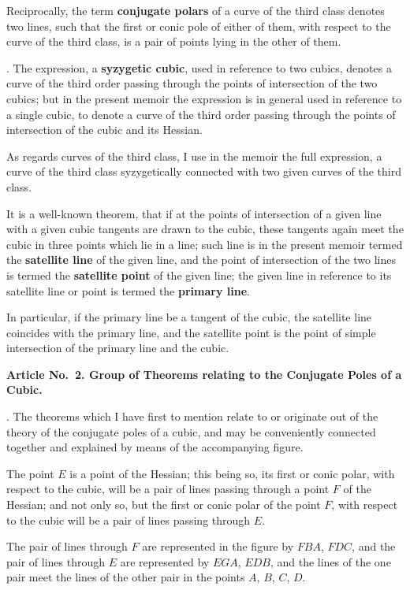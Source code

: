 \documentclass[11pt,a4paper]{book}
\begin{document}
\begin{center}
Reciprocally, the term \textbf{conjugate polars} of a curve of the
third class denotes two lines, such that the first or conic pole
of either of them, with respect to the curve of the third class,
is a pair of points lying in the other of them.

. The expression, a \textbf{syzygetic cubic}, used in reference to
two cubics, denotes a curve of the third order passing through
the points of intersection of the two cubics; but in the present
memoir the expression is in general used in reference to a single
cubic, to denote a curve of the third order passing through the
points of intersection of the cubic and its Hessian.

As regards curves of the third class, I use in the memoir
the full expression, a curve of the third class syzygetically
connected with two given curves of the third class.

It is a well-known theorem, that if at the points of intersection
of a given line with a given cubic tangents are drawn to the
cubic, these tangents again meet the cubic in three points
which lie in a line; such line is in the present memoir termed
the \textbf{satellite line} of the given line, and the point of intersection
of the two lines is termed the \textbf{satellite point} of the given line;
the given line in reference to its satellite line or point is termed
the \textbf{primary line}.

In particular, if the primary line be a tangent of the cubic,
the satellite line coincides with the primary line, and the
satellite point is the point of simple intersection of the primary
line and the cubic.

\medskip\noindent\textbf{Article No.~2. Group of Theorems relating to the Conjugate
Poles of a Cubic.}

. The theorems which I have first to mention relate to or
originate out of the theory of the conjugate poles of a cubic,
and may be conveniently connected together and explained by
means of the accompanying figure.

The point $E$ is a point of the Hessian; this being so, its
first or conic polar, with respect to the cubic, will be a pair
of lines passing through a point $F$ of the Hessian; and not
only so, but the first or conic polar of the point $F$, with respect
to the cubic will be a pair of lines passing through $E$.

The pair of lines through $F$ are represented in the figure by
$FBA$, $FDC$, and the pair of lines through $E$ are represented
by $EGA$, $EDB$, and the lines of the one pair meet the lines
of the other pair in the points $A$, $B$, $C$, $D$.


\end{center}
\end{document}
